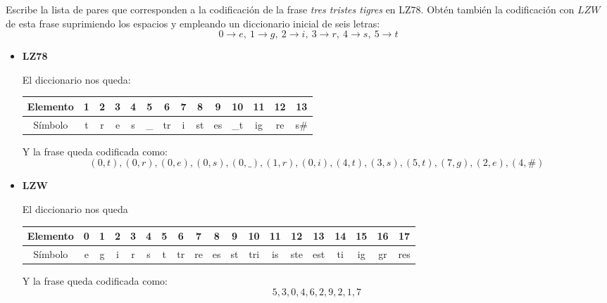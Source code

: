 \begin{problem}[14]
Escribe la lista de pares que corresponden a la codificación de la frase \textit{tres tristes tigres} en LZ78. Obtén también la codificación con $LZW$ de esta frase suprimiendo los espacios y empleando un diccionario inicial de seis letras:
\[0 \to e, \ 1 \to g, \ 2 \to i, \ 3 \to r, \ 4 \to s, \ 5 \to t\]
\solution

\yoP

\begin{itemize}
\item \textbf{LZ78}

El diccionario nos queda:
\begin{center}
\begin{tabular}{ | c | c | c | c | c | c | c | c | c | c | c | c | c | c |}
   \hline
   Elemento & 1 & 2 & 3 & 4 & 5 & 6 & 7 & 8 & 9 & 10 & 11 & 12 & 13\\
   \hline
   Símbolo & t & r & e & s & \_ & tr & i & st & es & \_t & ig & re &s\#\\
   \hline
 \end{tabular}
\end{center}

Y la frase queda codificada como:
\[(0,t),(0,r),(0,e),(0,s),(0,\_),(1, r),(0,i),(4,t),(3,s),(5,t),(7,g),(2,e),(4,\#)\]


\item \textbf{LZW}

El diccionario nos queda

\begin{adjustwidth}{-2cm}{-2cm}
\begin{tabular}{ | c | c | c | c | c | c | c | c | c | c | c | c | c | c | c | c | c | c | c | }
   \hline
   Elemento & 0 & 1 & 2 & 3 & 4 & 5 & 6 & 7 & 8 & 9 & 10 & 11 & 12 & 13 & 14 & 15 & 16 & 17  \\
   \hline
   Símbolo & e & g & i & r & s & t & tr & re & es & st & tri & is & ste & est & ti & ig & gr & res\\
   \hline
 \end{tabular}
\end{adjustwidth}
Y la frase queda codificada como:
\[5,3,0,4,6,2,9,2,1,7\]
\end{itemize}
\end{problem}

